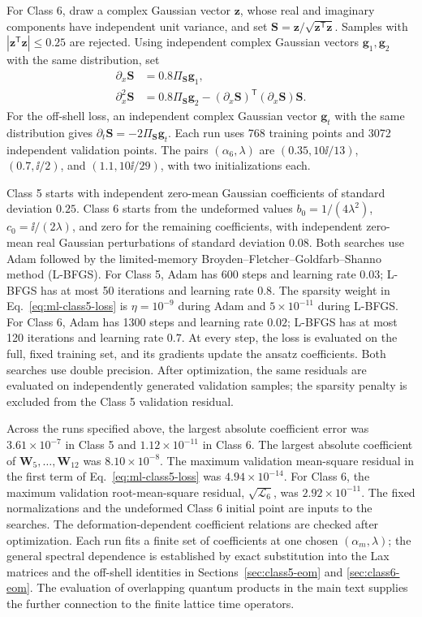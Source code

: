 For Class 6, draw a complex Gaussian vector $\boldsymbol z$, whose
real and imaginary components have independent unit variance, and set
$\boldsymbol S=\boldsymbol z/\sqrt{\boldsymbol z^{\mathsf T}\boldsymbol z}$.
Samples with $|\boldsymbol z^{\mathsf T}\boldsymbol z|\le0.25$ are rejected.
Using independent complex Gaussian vectors $\boldsymbol g_1,\boldsymbol g_2$
with the same distribution, set
\begin{align}
\partial_x\boldsymbol S&=0.8\Pi_{\boldsymbol S}\boldsymbol g_1,
\nonumber\\
\partial_x^2\boldsymbol S&=0.8\Pi_{\boldsymbol S}\boldsymbol g_2
 -(\partial_x\boldsymbol S)^{\mathsf T}(\partial_x\boldsymbol S)\boldsymbol S.
\label{eq:ml-class6-sampling}
\end{align}
For the off-shell loss, an independent complex Gaussian vector
$\boldsymbol g_t$ with the same distribution gives
$\partial_t\boldsymbol S=-2\Pi_{\boldsymbol S}\boldsymbol g_t$.
Each run uses 768 training points and 3072 independent validation points.
The pairs $(\alpha_6,\lambda)$ are $(0.35,10\ii/13)$,
$(0.7,\ii/2)$, and $(1.1,10\ii/29)$, with two initializations each.

Class 5 starts with independent zero-mean Gaussian coefficients of standard
deviation $0.25$.  Class 6 starts from the undeformed values
$b_0=1/(4\lambda^2)$, $c_0=\ii/(2\lambda)$, and zero for the remaining
coefficients, with independent zero-mean real Gaussian perturbations of
standard deviation $0.08$.
Both searches use Adam followed by the limited-memory
Broyden--Fletcher--Goldfarb--Shanno method (L-BFGS).
For Class 5, Adam has 600 steps and learning rate $0.03$;
L-BFGS has at most 50 iterations and learning rate $0.8$.
The sparsity weight in Eq.~\eqref{eq:ml-class5-loss} is
$\eta=10^{-9}$ during Adam and $5\times10^{-11}$ during L-BFGS.
For Class 6, Adam has 1300 steps and learning rate $0.02$;
L-BFGS has at most 120 iterations and learning rate $0.7$.
At every step, the loss is evaluated on the full, fixed training set,
and its gradients update the ansatz coefficients.  Both searches use
double precision.  After optimization, the same residuals are evaluated
on independently generated validation samples; the sparsity penalty is
excluded from the Class 5 validation residual.

Across the runs specified above, the largest absolute
coefficient error was $3.61\times10^{-7}$ in Class 5 and
$1.12\times10^{-11}$ in Class 6.  The largest absolute coefficient of
$\boldsymbol W_5,\ldots,\boldsymbol W_{12}$ was $8.10\times10^{-8}$.
The maximum validation mean-square residual in the first term of
Eq.~\eqref{eq:ml-class5-loss} was $4.94\times10^{-14}$.
For Class 6, the maximum validation root-mean-square residual,
$\sqrt{\mathcal L_6}$, was $2.92\times10^{-11}$.
The fixed normalizations and the undeformed Class 6 initial point are
inputs to the searches.  The deformation-dependent coefficient relations
are checked after optimization.  Each run fits a finite set of coefficients
at one chosen $(\alpha_m,\lambda)$; the general spectral dependence is
established by exact substitution into the Lax matrices and the off-shell
identities in Sections~\ref{sec:class5-eom} and \ref{sec:class6-eom}.
The evaluation of
overlapping quantum products in the main text supplies the further
connection to the finite lattice time operators.
